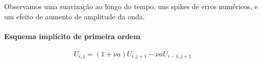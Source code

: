 \documentclass[11pt]{article}
\begin{document}
        

        
        
        
 
    Observamos uma suavização ao longo do tempo, uns spikes de erros
numéricos, e um efeito de aumento de amplitude da onda.

    \hypertarget{esquema-impluxedcito-de-primeira-ordem}{%
\paragraph{Esquema implícito de primeira
ordem}}
 

    \[U_{i,j} = (1+\nu a)U_{i,j+1} - \nu aU_{i-1,j+1}\]
\end{document}
